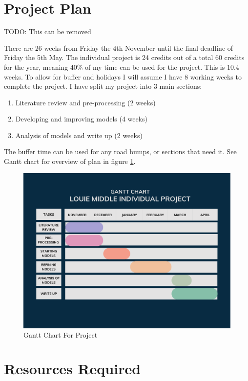 \documentclass[12pt,a4paper]{report}
\begin{document}
\section{Project Plan}

TODO: This can be removed

There are 26 weeks from Friday the 4th November until the final deadline of Friday the 5th May. 
The individual project is 24 credits out of a total 60 credits for the year, meaning 40\% of my time can be used for the project. 
This is 10.4 weeks. 
To allow for buffer and holidays I will assume I have 8 working weeks to complete the project. 
I have split my project into 3 main sections:

\begin{enumerate}
    \item Literature review and pre-processing (2 weeks)
    \item Developing and improving models (4 weeks)
    \item Analysis of models and write up (2 weeks)
\end{enumerate}

The buffer time can be used for any road bumps, or sections that need it. 
See Gantt chart for overview of plan in figure \ref{fig:gantt_chart}.

\begin{figure}[H]
    \centering
    \includegraphics[width=\linewidth]{Gantt Chart.png}
    \caption{Gantt Chart For Project}
    \label{fig:gantt_chart}
\end{figure}

\section{Resources Required}
\end{document}
